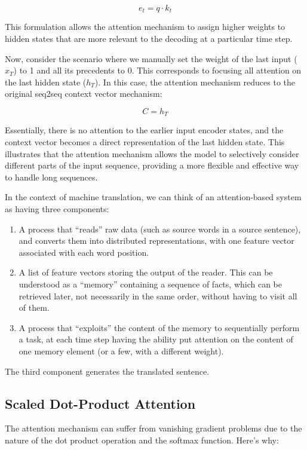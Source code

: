 \documentclass{report}
\begin{document}
\[ e_t = q \cdot k_t \]

This formulation allows the attention mechanism to assign higher weights to hidden states that are more relevant to the decoding at a particular time step.

Now, consider the scenario where we manually set the weight of the last input (\(x_T\)) to 1 and all its precedents to 0. This corresponds to focusing all attention on the last hidden state (\(h_T\)). In this case, the attention mechanism reduces to the original seq2seq context vector mechanism:

\[ C = h_T \]

Essentially, there is no attention to the earlier input encoder states, and the context vector becomes a direct representation of the last hidden state. This illustrates that the attention mechanism allows the model to selectively consider different parts of the input sequence, providing a more flexible and effective way to handle long sequences.

In the context of machine translation, we can think of an attention-based system as having three components:

\begin{enumerate}
	\item A process that “reads” raw data (such as source words in a source sentence), and converts them into distributed representations, with one feature vector associated with each word position.

	\item A list of feature vectors storing the output of the reader. This can be understood as a “memory” containing a sequence of facts, which can be retrieved later, not necessarily in the same order, without having to visit all of them.
	\item A process that “exploits” the content of the memory to sequentially perform a task, at each time step having the ability put attention on the content of one memory element (or a few, with a different weight).
\end{enumerate}

The third component generates the translated sentence.

\subsection{Scaled Dot-Product Attention}
The attention mechanism can suffer from vanishing gradient problems due to the nature of the dot product operation and the softmax function. Here's why:
\end{document}

